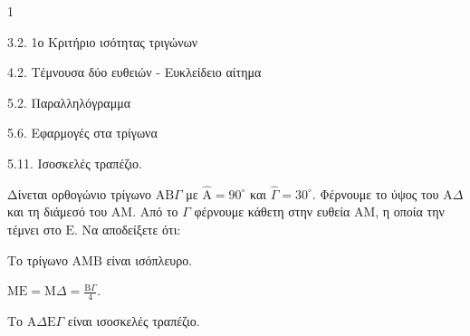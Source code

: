 \begin{ylh}{1}
    \item 3.2. 1ο Κριτήριο ισότητας τριγώνων
    \item 4.2. Τέμνουσα δύο ευθειών - Ευκλείδειο αίτημα
    \item 5.2. Παραλληλόγραμμα
    \item 5.6. Εφαρμογές στα τρίγωνα
    \item 5.11. Ισοσκελές τραπέζιο.
\end{ylh}
Δίνεται ορθογώνιο τρίγωνο $\mathrm{A}\mathrm{B}\Gamma$ με $\hat{\mathrm{A}} = 90^\circ$ και $\hat{\Gamma} = 30^\circ$. Φέρνουμε το ύψος του $\mathrm{A}\Delta$ και τη διάμεσό του $\mathrm{A}\mathrm{M}$. Από το $\Gamma$ φέρνουμε κάθετη στην ευθεία $\mathrm{A}\mathrm{M}$, η οποία την τέμνει στο $\mathrm{E}$.
Να αποδείξετε ότι:
\begin{alist}
    \item Το τρίγωνο $\mathrm{A}\mathrm{M}\mathrm{B}$ είναι ισόπλευρο. 
    \item $\mathrm{M}\mathrm{E} = \mathrm{M}\Delta = \frac{\mathrm{B}\Gamma}{4}$. 
    \item Το $\mathrm{A}\Delta\mathrm{E}\Gamma$ είναι ισοσκελές τραπέζιο. 
\end{alist}
